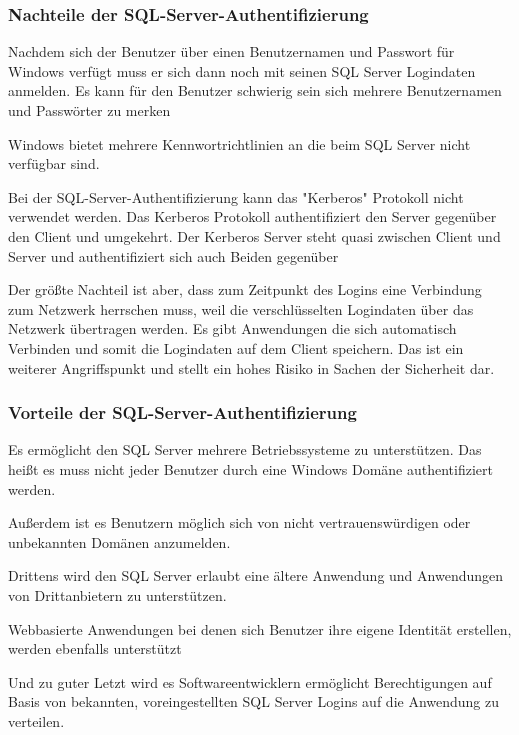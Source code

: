 \begin{flushleft}

\subsubsection{Nachteile der SQL-Server-Authentifizierung}

Nachdem sich der Benutzer über einen Benutzernamen und Passwort für Windows verfügt muss er sich dann noch mit seinen SQL Server Logindaten anmelden. Es kann für den Benutzer schwierig sein sich mehrere Benutzernamen und Passwörter zu merken



Windows bietet mehrere Kennwortrichtlinien an die beim SQL Server nicht verfügbar sind.
\break


Bei der SQL-Server-Authentifizierung kann das "Kerberos" Protokoll nicht verwendet werden.
Das Kerberos Protokoll authentifiziert den Server gegenüber den Client und umgekehrt. Der Kerberos Server steht quasi zwischen Client und Server und authentifiziert sich auch Beiden gegenüber
\break


Der größte Nachteil ist aber, dass zum Zeitpunkt des Logins eine Verbindung zum Netzwerk herrschen muss, weil die verschlüsselten Logindaten über das Netzwerk übertragen werden.
Es gibt Anwendungen die sich automatisch Verbinden und somit die Logindaten auf dem Client speichern. Das ist ein weiterer Angriffspunkt und stellt ein hohes Risiko in Sachen der Sicherheit dar.
\break
\break
\break
\subsubsection{Vorteile der SQL-Server-Authentifizierung}

Es ermöglicht den SQL Server mehrere Betriebssysteme zu unterstützen. Das heißt es muss nicht jeder Benutzer durch eine Windows Domäne authentifiziert werden.
\break


Außerdem ist es Benutzern möglich sich von nicht vertrauenswürdigen oder unbekannten Domänen anzumelden.
\break


Drittens wird den SQL Server erlaubt eine ältere Anwendung und Anwendungen von Drittanbietern zu unterstützen.
\break


Webbasierte Anwendungen bei denen sich Benutzer ihre eigene Identität erstellen, werden ebenfalls unterstützt
\break


Und zu guter Letzt wird es Softwareentwicklern ermöglicht Berechtigungen auf Basis von bekannten, voreingestellten SQL Server Logins auf die Anwendung zu verteilen. 


\end{flushleft}
